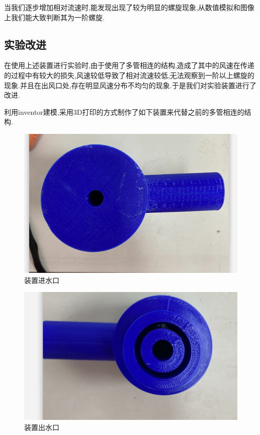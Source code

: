 \documentclass[UTF8]{gapd}
\begin{document}
当我们逐步增加相对流速时,能发现出现了较为明显的螺旋现象,从数值模拟和图像上我们能大致判断其为一阶螺旋.

\subsection{实验改进}

在使用上述装置进行实验时,由于使用了多管相连的结构,造成了其中的风速在传递的过程中有较大的损失,风速较低导致了相对流速较低,无法观察到一阶以上螺旋的现象.并且在出风口处,存在明显风速分布不均匀的现象.于是我们对实验装置进行了改进.

利用inventor建模,采用3D打印的方式制作了如下装置来代替之前的多管相连的结构.
\begin{figure}[H]
	\centering
	\includegraphics[width=0.8\linewidth]{images/蓝头1}
	\caption{装置进水口}
	\label{fig:P13}
\end{figure}
\begin{figure}[H]
	\centering
	\includegraphics[width=0.8\linewidth]{images/蓝头2}
	\caption{装置出水口}
	\label{fig:P14}
\end{figure}
\end{document}
